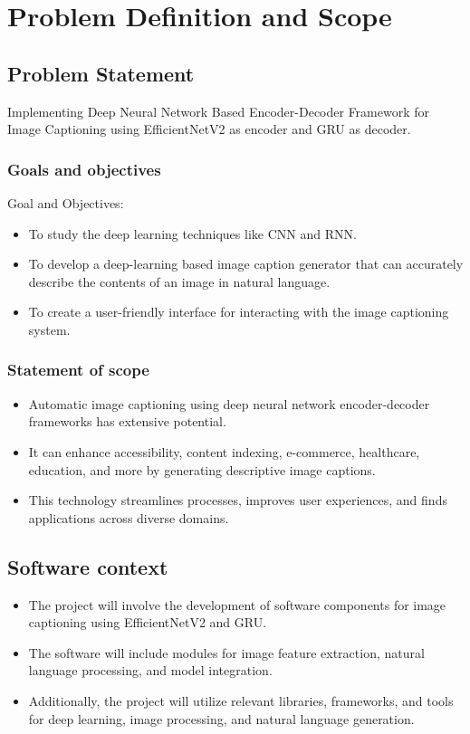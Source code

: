 \documentclass[oneside,a4paper,12pt]{report}
\begin{document}
\chapter{Problem Definition and Scope}
\section{Problem Statement}
Implementing Deep Neural Network Based Encoder-Decoder Framework for Image Captioning using EfficientNetV2 as encoder and GRU as decoder.


\subsection{Goals and objectives}  
Goal and Objectives: 
\begin{itemize}
  	\item To study the deep learning techniques like CNN and RNN.
  	\item To develop a deep-learning based image caption generator that can accurately describe the contents of an image in natural language.
  	\item To create a user-friendly interface for interacting with the image captioning system.
\end{itemize}

 \subsection{Statement of scope} 
	\begin{itemize}  
	\item	Automatic image captioning using deep neural network encoder-decoder frameworks has extensive potential.
\item It can enhance accessibility, content indexing, e-commerce, healthcare, education, and more by generating descriptive image captions.
\item This technology streamlines processes, improves user experiences, and finds applications across diverse domains.
	\end{itemize}

\section{Software context} 
\begin{itemize}
\item The project will involve the development of software components for image captioning using EfficientNetV2 and GRU.
\item The software will include modules for image feature extraction, natural language processing, and model integration.
\item Additionally, the project will utilize relevant libraries, frameworks, and tools for deep learning, image processing, and natural language generation.
\end{itemize}
\end{document}
